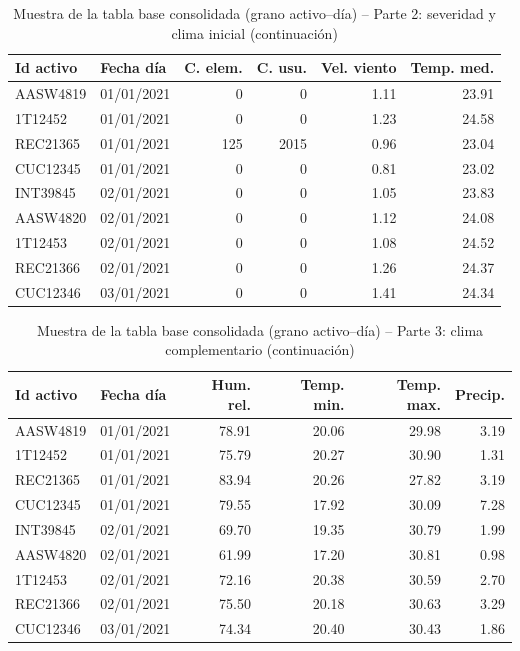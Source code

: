 \begin{table}[!htbp]
\centering
    \small
    \caption{Muestra de la tabla base consolidada (grano activo--día) -- Parte 2: severidad y clima inicial (continuación)}
    \label{tab:muestra_consolidado_final_2}
    \begin{tabular}{l l r r r r}
    \toprule
    \textbf{Id activo} & \textbf{Fecha día} & \textbf{C. elem.} & \textbf{C. usu.} & \textbf{Vel. viento} & \textbf{Temp. med.} \\
    \midrule
    AASW4819 & 01/01/2021 & 0   & 0    & 1.11 & 23.91 \\
    1T12452  & 01/01/2021 & 0   & 0    & 1.23 & 24.58 \\
    REC21365 & 01/01/2021 & 125 & 2015 & 0.96 & 23.04 \\
    CUC12345 & 01/01/2021 & 0   & 0    & 0.81 & 23.02 \\
    INT39845 & 02/01/2021 & 0   & 0    & 1.05 & 23.83 \\
    AASW4820 & 02/01/2021 & 0   & 0    & 1.12 & 24.08 \\
    1T12453  & 02/01/2021 & 0   & 0    & 1.08 & 24.52 \\
    REC21366 & 02/01/2021 & 0   & 0    & 1.26 & 24.37 \\
    CUC12346 & 03/01/2021 & 0   & 0    & 1.41 & 24.34 \\
    \bottomrule
    \end{tabular}
    \end{table}

\begin{table}[!htbp]
\centering
    \small
    \caption{Muestra de la tabla base consolidada (grano activo--día) -- Parte 3: clima complementario (continuación)}
    \label{tab:muestra_consolidado_final_3}
    \begin{tabular}{l l r r r r}
    \toprule
    \textbf{Id activo} & \textbf{Fecha día} & \textbf{Hum. rel.} & \textbf{Temp. min.} & \textbf{Temp. max.} & \textbf{Precip.} \\
    \midrule
    AASW4819 & 01/01/2021 & 78.91 & 20.06 & 29.98 & 3.19 \\
    1T12452  & 01/01/2021 & 75.79 & 20.27 & 30.90 & 1.31 \\
    REC21365 & 01/01/2021 & 83.94 & 20.26 & 27.82 & 3.19 \\
    CUC12345 & 01/01/2021 & 79.55 & 17.92 & 30.09 & 7.28 \\
    INT39845 & 02/01/2021 & 69.70 & 19.35 & 30.79 & 1.99 \\
    AASW4820 & 02/01/2021 & 61.99 & 17.20 & 30.81 & 0.98 \\
    1T12453  & 02/01/2021 & 72.16 & 20.38 & 30.59 & 2.70 \\
    REC21366 & 02/01/2021 & 75.50 & 20.18 & 30.63 & 3.29 \\
    CUC12346 & 03/01/2021 & 74.34 & 20.40 & 30.43 & 1.86 \\
    \bottomrule
    \end{tabular}
    \end{table}


